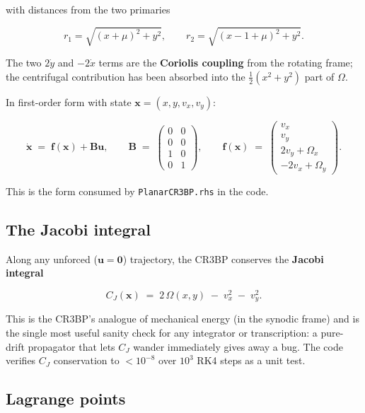\documentclass[8pt,a4paper]{article}
\newcommand{\bvec}[1]{\bm{#1}}
\newcommand{\xvec}{\bvec{x}}
\newcommand{\uvec}{\bvec{u}}
\newcommand{\fvec}{\bvec{f}}
\newcommand{\Omegax}{\Omega_x}
\newcommand{\Omegay}{\Omega_y}
\newcommand{\Bmat}{\bvec{B}}
\theoremstyle{definition}
\theoremstyle{remark}
\begin{document}
with distances from the two primaries

\[
  r_1 = \sqrt{(x+\mu)^2 + y^2}, \qquad
  r_2 = \sqrt{(x - 1 + \mu)^2 + y^2}.
\]

The two $2\dot{y}$ and $-2\dot{x}$ terms are the \textbf{Coriolis
coupling} from the rotating frame; the centrifugal contribution has
been absorbed into the $\tfrac12(x^2+y^2)$ part of $\Omega$.

In first-order form with state $\xvec = (x, y, v_x, v_y)$:

\begin{equation}
  \dot{\xvec} \;=\; \fvec(\xvec) + \Bmat \uvec,
  \qquad
  \Bmat \;=\;
  \begin{pmatrix}
    0 & 0 \\ 0 & 0 \\ 1 & 0 \\ 0 & 1
  \end{pmatrix},
  \qquad
  \fvec(\xvec) \;=\;
  \begin{pmatrix}
    v_x \\ v_y \\
    2 v_y + \Omegax \\
    -2 v_x + \Omegay
  \end{pmatrix}.
\label{eq:cr3bp-1st-order}
\end{equation}

This is the form consumed by \texttt{PlanarCR3BP.rhs} in the code.

\subsection{The Jacobi integral}

Along any unforced ($\uvec = \bm 0$) trajectory, the CR3BP conserves
the \textbf{Jacobi integral}

\begin{equation}
  C_J(\xvec) \;=\; 2\,\Omega(x, y) \;-\; v_x^2 \;-\; v_y^2.
  \label{eq:jacobi}
\end{equation}

This is the CR3BP's analogue of mechanical energy (in the synodic
frame) and is the single most useful sanity check for any integrator
or transcription: a pure-drift propagator that lets $C_J$ wander
immediately gives away a bug. The code verifies $C_J$ conservation to
$<10^{-8}$ over $10^3$ RK4 steps as a unit test.

\subsection{Lagrange points}
\end{document}
